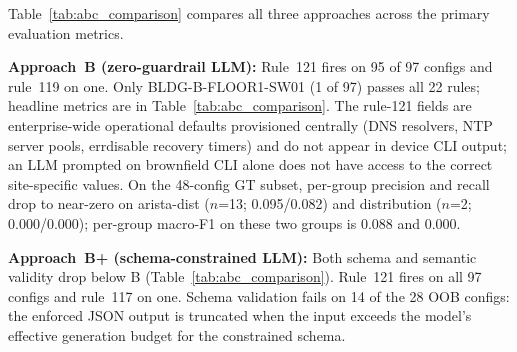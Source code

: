 \documentclass[conference]{IEEEtran}
\begin{document}
Table~\ref{tab:abc_comparison} compares all three approaches across the primary evaluation metrics.

\begin{table}[htbp]
\centering
\caption{Four-approach comparison. Sch., Sem., Esc., and Lat.\ are computed on the full 97-config corpus; F1 and OC are macro-averaged on the 48-config GT subset. Lat.\ is median end-to-end wall-clock per config.}
\label{tab:abc_comparison}
\end{table}

\textbf{Approach~B (zero-guardrail LLM):} Rule~121 fires on 95 of 97 configs and rule~119 on one. Only BLDG-B-FLOOR1-SW01 (1 of 97) passes all 22 rules; headline metrics are in Table~\ref{tab:abc_comparison}. The rule-121 fields are enterprise-wide operational defaults provisioned centrally (DNS resolvers, NTP server pools, errdisable recovery timers) and do not appear in device CLI output; an LLM prompted on brownfield CLI alone does not have access to the correct site-specific values. On the 48-config GT subset, per-group precision and recall drop to near-zero on arista-dist ($n$=13; 0.095/0.082) and distribution ($n$=2; 0.000/0.000); per-group macro-F1 on these two groups is 0.088 and 0.000.

\textbf{Approach~B+ (schema-constrained LLM):} Both schema and semantic validity drop below B (Table~\ref{tab:abc_comparison}). Rule~121 fires on all 97 configs and rule~117 on one. Schema validation fails on 14 of the 28 OOB configs: the enforced JSON output is truncated when the input exceeds the model's effective generation budget for the constrained schema.
\end{document}

